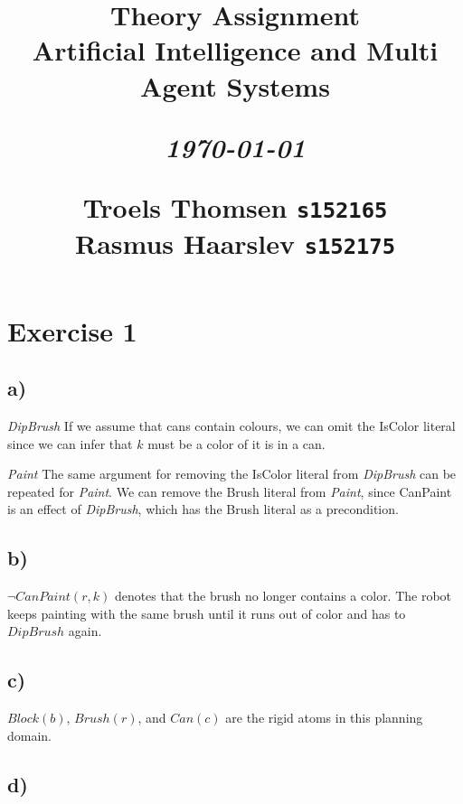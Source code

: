 \documentclass[12pt]{article}
\title{
  \vspace{4cm}
  \begin{flushleft}
  \Large{\textbf{Theory Assignment}} \\
  \large{Artificial Intelligence and Multi Agent Systems}
  \end{flushleft}
  \vspace{0cm}
  \begin{flushleft}
  \small
  \textit{\today}
  \end{flushleft}
  \vspace{12cm}
  \begin{flushleft}
  \small
  Troels Thomsen \texttt{s152165} \\
  Rasmus Haarslev \texttt{s152175} \\
  \end{flushleft}
}
\date{
}
\begin{document}
\clearpage
{}
\thispagestyle{empty}
\maketitle

\newpage

\section*{Exercise 1}

\subsection*{a)}
\label{sub:a)}

\textit{DipBrush} If we assume that cans contain colours, we can omit the IsColor literal since we can infer that $k$ must be a color of it is in a can.

\textit{Paint} The same argument for removing the IsColor literal from \textit{DipBrush} can be repeated for \textit{Paint}. We can remove the Brush literal from \textit{Paint}, since CanPaint is an effect of \textit{DipBrush}, which has the Brush literal as a precondition.

\subsection*{b)}
\label{sub:b)}

$\neg CanPaint(r, k)$ denotes that the brush no longer contains a color. The robot keeps painting with the same brush until it runs out of color and has to $DipBrush$ again.

\subsection*{c)}
\label{sub:c)}

$Block(b)$, $Brush(r)$, and $Can(c)$ are the rigid atoms in this planning domain.

\subsection*{d)}
\label{sub:d)}
\end{document}

